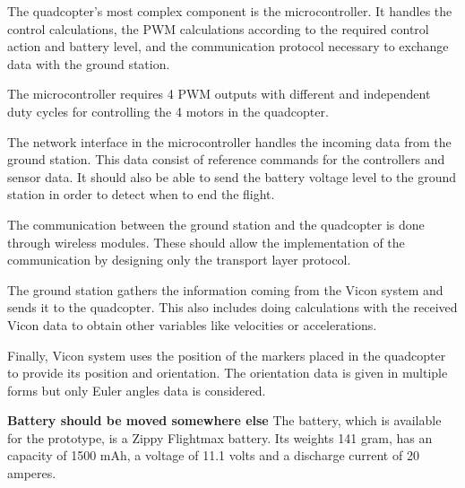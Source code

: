 The quadcopter's most complex component is the microcontroller. It handles the control calculations, the PWM calculations according to the required control action and battery level, and the communication protocol necessary to exchange data with the ground station.

The microcontroller requires 4 PWM outputs with different and independent duty cycles for controlling the 4 motors in the quadcopter. 

The network interface in the microcontroller handles the incoming data from the ground station. This data consist of reference commands for the controllers and sensor data. It should also be able to send the battery voltage level to the ground station in order to detect when to end the flight.

The communication between the ground station and the quadcopter is done through wireless modules. These should allow the implementation of the communication by designing only the transport layer protocol.

The ground station gathers the information coming from the Vicon system and sends it to the quadcopter. This also includes doing calculations with the received Vicon data to obtain other variables like velocities or accelerations.

Finally, Vicon system uses the position of the markers placed in the quadcopter to provide its position and orientation. The orientation data is given in multiple forms but only Euler angles data is considered.


\textbf{Battery should be moved somewhere else}
The battery, which is available for the prototype, is a Zippy Flightmax battery. Its weights 141 gram, has an capacity of 1500 mAh, a voltage of 11.1 volts and a discharge current of 20 amperes. 




